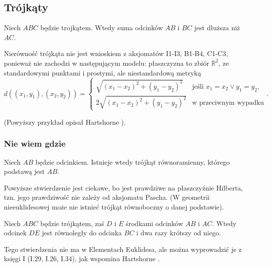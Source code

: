 \subsection{Trójkąty}

\begin{proposition}
	Niech $ABC$ będzie trojkątem.
	Wtedy suma odcinków $AB$ i $BC$ jest dłuższa niż $AC$.
\end{proposition}

Nierówność trójkąta nie jest wnioskiem z aksjomatów I1-I3, B1-B4, C1-C3, ponieważ nie zachodzi w następującym modelu: płaszczyzna to zbiór $\mathbb R^2$, ze standardowymi punktami i prostymi, ale niestandardową metryką
\begin{equation}
	d((x_1, y_1), (x_2, y_2)) = \begin{cases}
		\sqrt{(x_1-x_2)^2 + (y_1-y_2)^2} & \text{jeśli } x_1 = x_2 \vee y_1 = y_2, \\
		2 \sqrt{(x_1-x_2)^2 + (y_1-y_2)^2} & \text{w przeciwnym wypadku}
	\end{cases}.
\end{equation}

(Powyższy przykład opisał Hartshorne \cite[s. 90]{hartshorne2000}).

\subsubsection{Nie wiem gdzie}

\begin{proposition}
	\label{hartshorne_52}
    Niech $AB$ będzie odcinkiem.
	Istnieje wtedy trójkąt równoramienny, którego podstawą jest $AB$.
\end{proposition}

Powyższe stwierdzenie jest ciekawe, bo jest prawdziwe na płaszczyźnie Hilberta, tzn. jego prawdziwość nie zależy od aksjomatu Pascha.
(W geometrii nieeuklidesowej może nie istnieć trójkąt równoboczny o danej podstawie).


\begin{proposition}
	\label{hartshorne_52}
    Niech $ABC$ będzie trójkątem, zaś $D$ i $E$ środkami odcinków $AB$ i $AC$.
	Wtedy odcinek $DE$ jest równoległy do odcinka $BC$ i dwa razy krótszy od niego.
\end{proposition}

Tego stwierdzenia nie ma w Elementach Euklidesa, ale można wyprowadzić je z księgi I (I.29, I.26, I.34), jak wspomina Hartshorne \cite[s. 52. 53]{hartshorne2000}.

